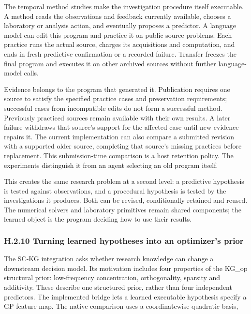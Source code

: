 \documentclass[twoside,11pt]{article}
\begin{document}
The temporal method studies make the investigation procedure itself executable.
A method reads the observations and feedback currently available, chooses a
laboratory or analysis action, and eventually proposes a predictor. A language
model can edit this program and practice it on public source problems. Each
practice runs the actual source, charges its acquisitions and computation, and
ends in fresh predictive confirmation or a recorded failure. Transfer freezes
the final program and executes it on other archived sources without further
language-model calls.


Evidence belongs to the program that generated it. Publication requires one
source to satisfy the specified practice cases and preservation requirements;
successful cases from incompatible edits do not form a successful method.
Previously practiced sources remain available with their own results. A later
failure withdraws that source's support for the affected case until new evidence
repairs it. The current implementation can also compare a submitted revision
with a supported older source, completing that source's missing practices before
replacement. This submission-time comparison is a host retention policy. The
experiments distinguish it from an agent selecting an old program itself.


This creates the same research problem at a second level: a predictive hypothesis
is tested against observations, and a procedural hypothesis is tested by the
investigations it produces. Both can be revised, conditionally retained and
reused. The numerical solvers and laboratory primitives remain shared components;
the learned object is the program deciding how to use their results.


\subsubsection*{H.2.10 Turning learned hypotheses into an optimizer's prior}

The SC-KG integration asks whether research knowledge can change a downstream
decision model. Its motivation includes four properties of the KG\_op structural
prior: low-frequency concentration, orthogonality, sparsity and additivity.
These describe one structured prior, rather than four independent predictors.
The implemented bridge lets a learned executable hypothesis specify a GP feature
map. The native comparison uses a coordinatewise quadratic basis,
\end{document}
